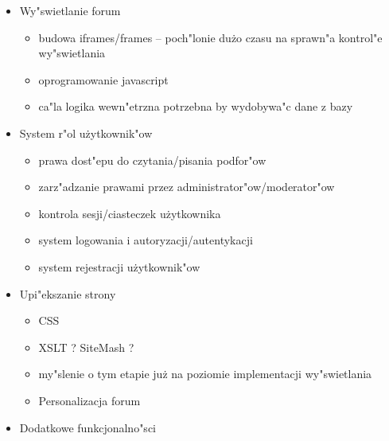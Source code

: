 \documentclass[12pt,a4paper,twoside]{article}
\begin{document}
\begin{itemize}
\item		Wy"swietlanie forum
	\begin{itemize}
		\item budowa iframes/frames -- poch"lonie du\.zo czasu na sprawn"a kontrol"e wy"swietlania
		\item oprogramowanie javascript
		\item ca"la logika wewn"etrzna potrzebna by wydobywa"c dane z bazy
	\end{itemize}
\item 		System r"ol u\.zytkownik"ow
	\begin{itemize}
		\item prawa dost"epu do czytania/pisania podfor"ow
		\item zarz"adzanie prawami przez administrator"ow/moderator"ow
		\item kontrola sesji/ciasteczek u\.zytkownika
		\item system logowania i autoryzacji/autentykacji
		\item system rejestracji u\.zytkownik"ow
	\end{itemize}	
\item 		Upi"ekszanie strony
	\begin{itemize}
		\item CSS
		\item XSLT ? SiteMash ?
		\item my"slenie o tym etapie ju\.z na poziomie implementacji wy"swietlania
		\item Personalizacja forum
	\end{itemize}	
\item 		Dodatkowe funkcjonalno"sci
\end{itemize}		
\end{document}
